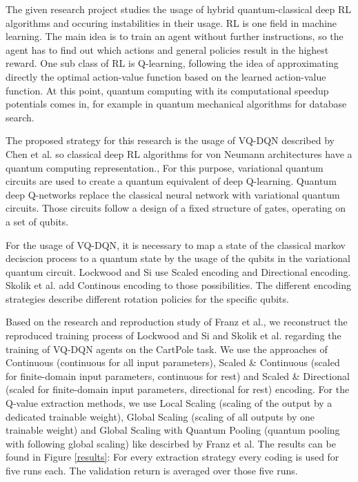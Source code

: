 The given research project studies the usage of hybrid quantum-classical deep \ac{RL} algorithms and occuring instabilities in their usage.
\ac{RL} is one field in machine learning.
The main idea is to train an agent without further instructions, so the agent has to find out which actions and general policies result in the highest reward.
One sub class of \ac{RL} is Q-learning, following the idea of approximating directly the optimal action-value function based on the learned action-value function.\autocite{rl}
At this point, quantum computing with its computational speedup potentials comes in, for example in quantum mechanical algorithms for database search\autocite{databasesearch}. 


The proposed strategy for this research is the usage of \ac{VQ-DQN} described by Chen et al. so classical deep \ac{RL} algorithms for von Neumann architectures have a quantum computing representation.\autocite{vqdqn},
For this purpose, variational quantum circuits are used to create a quantum equivalent of deep Q-learning.
Quantum deep Q-networks replace the classical neural network with variational quantum circuits.
Those circuits follow a design of a fixed structure of gates, operating on a set of qubits.\autocite{circuits}


For the usage of \ac{VQ-DQN}, it is necessary to map a state of the classical markov deciscion process to a quantum state by the usage of the qubits in the variational quantum circuit. 
Lockwood and Si use Scaled encoding and Directional encoding.\autocite{lockwood}
Skolik et al. add Continous encoding to those possibilities.\autocite{skolik} 
The different encoding strategies describe different rotation policies for the specific qubits.


Based on the research and reproduction study of Franz et al.\autocite{instabilities}, we reconstruct the reproduced training process of Lockwood and Si\autocite{lockwood} and Skolik et al.\autocite{skolik} regarding the training of \ac{VQ-DQN} agents on the CartPole task. 
We use the approaches of Continuous (continuous for all input parameters), Scaled \& Continuous (scaled for finite-domain input parameters, continuous for rest) and Scaled \& Directional (scaled for finite-domain input parameters, directional for rest) encoding. 
For the Q-value extraction methods, we use Local Scaling (scaling of the output by a dedicated trainable weight), Global Scaling (scaling of all outputs by one trainable weight) and Global Scaling with Quantum Pooling (quantum pooling with following global scaling) like descirbed by Franz et al.\autocite{instabilities}
The results can be found in Figure \ref{results}: For every extraction strategy every coding is used for five runs each.
The validation return is averaged over those five runs.

